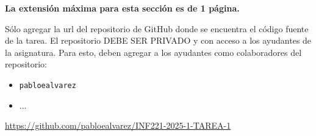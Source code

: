 \begin{mdframed}
    \textbf{La extensión máxima para esta sección es de 1 página.}
\end{mdframed}


Sólo agregar la url del repositorio de GitHub donde se encuentra el código fuente de la tarea. El repositorio DEBE SER PRIVADO y con acceso a los ayudantes de la asignatura. Para esto, deben agregar a los ayudantes como colaboradores del repositorio:

\begin{itemize}
    \item \texttt{pabloealvarez}
    \item ...
\end{itemize}

\begin{mdframed}
    \begin{center}
        {\Large \url{https://github.com/pabloealvarez/INF221-2025-1-TAREA-1}}
    \end{center}
\end{mdframed}